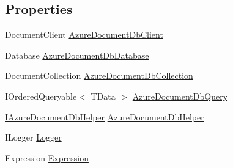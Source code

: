 \subsection*{Properties}
\begin{DoxyCompactItemize}
\item 
Document\+Client \hyperlink{classCqrs_1_1Azure_1_1DocumentDb_1_1DataStores_1_1AzureDocumentDbDataStore_a76ff9f2318e11c5c36063235a9bcdf10_a76ff9f2318e11c5c36063235a9bcdf10}{Azure\+Document\+Db\+Client}
\item 
Database \hyperlink{classCqrs_1_1Azure_1_1DocumentDb_1_1DataStores_1_1AzureDocumentDbDataStore_a9ef620e44e6f04e0720603a9b2bd8215_a9ef620e44e6f04e0720603a9b2bd8215}{Azure\+Document\+Db\+Database}
\item 
Document\+Collection \hyperlink{classCqrs_1_1Azure_1_1DocumentDb_1_1DataStores_1_1AzureDocumentDbDataStore_a281b599a47394eb90b9a5e315a537c9e_a281b599a47394eb90b9a5e315a537c9e}{Azure\+Document\+Db\+Collection}
\item 
I\+Ordered\+Queryable$<$ T\+Data $>$ \hyperlink{classCqrs_1_1Azure_1_1DocumentDb_1_1DataStores_1_1AzureDocumentDbDataStore_a85f8d092ece684d0277642f45f550263_a85f8d092ece684d0277642f45f550263}{Azure\+Document\+Db\+Query}
\item 
\hyperlink{interfaceCqrs_1_1Azure_1_1DocumentDb_1_1IAzureDocumentDbHelper}{I\+Azure\+Document\+Db\+Helper} \hyperlink{classCqrs_1_1Azure_1_1DocumentDb_1_1DataStores_1_1AzureDocumentDbDataStore_af6e9a6b6b5a22136e4a1f4fde85430c8_af6e9a6b6b5a22136e4a1f4fde85430c8}{Azure\+Document\+Db\+Helper}
\item 
I\+Logger \hyperlink{classCqrs_1_1Azure_1_1DocumentDb_1_1DataStores_1_1AzureDocumentDbDataStore_af46a754a1576e4c2422b8a5d642abc5c_af46a754a1576e4c2422b8a5d642abc5c}{Logger}
\item 
Expression \hyperlink{classCqrs_1_1Azure_1_1DocumentDb_1_1DataStores_1_1AzureDocumentDbDataStore_a47d5ae1b47f4166210d1caab58467529_a47d5ae1b47f4166210d1caab58467529}{Expression}

\end{DoxyCompactItemize}
